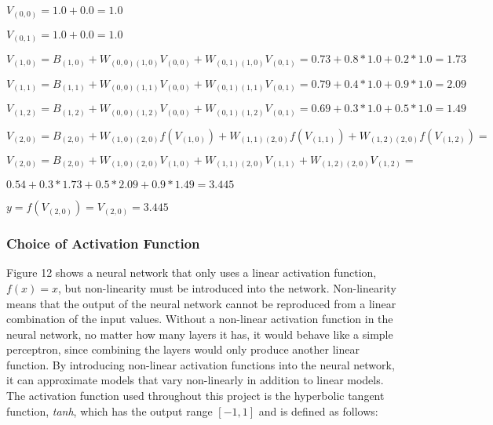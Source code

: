 \documentclass[titlepage]{article}
\begin{document}
\vskip 0.8cm

\centerline{$V_{(0, 0)} = 1.0 + 0.0 = 1.0$}

\vskip 0.2cm

\centerline{$V_{(0, 1)} = 1.0 + 0.0 = 1.0$}

\vskip 0.5cm

\centerline{$V_{(1, 0)} = B_{(1, 0)} + W_{(0, 0) (1, 0)} V_{(0, 0)} + W_{(0, 1) (1, 0)} V_{(0, 1)} = 0.73 + 0.8 * 1.0 + 0.2 * 1.0 = 1.73$}

\vskip 0.2cm

\centerline{$V_{(1, 1)} = B_{(1, 1)} + W_{(0, 0) (1, 1)} V_{(0, 0)} + W_{(0, 1) (1, 1)} V_{(0, 1)} = 0.79 + 0.4 * 1.0 + 0.9 * 1.0 = 2.09$}

\vskip 0.2cm

\centerline{$V_{(1, 2)} = B_{(1, 2)} + W_{(0, 0) (1, 2)} V_{(0, 0)} + W_{(0, 1) (1, 2)} V_{(0, 1)} = 0.69 + 0.3 * 1.0 + 0.5 * 1.0 = 1.49$}

\vskip 0.5cm

\centerline{$V_{(2, 0)} = B_{(2, 0)} + W_{(1, 0) (2, 0)} f(V_{(1, 0)}) + W_{(1, 1) (2, 0)} f(V_{(1, 1)}) + W_{(1, 2) (2, 0)} f(V_{(1, 2)}) =$}

\vskip 0.2cm

\centerline{$V_{(2, 0)} = B_{(2, 0)} + W_{(1, 0) (2, 0)} V_{(1, 0)} + W_{(1, 1) (2, 0)} V_{(1, 1)} + W_{(1, 2) (2, 0)} V_{(1, 2)} =$}

\vskip 0.2cm

\centerline{$0.54 + 0.3 * 1.73 + 0.5 * 2.09 + 0.9 * 1.49 = 3.445$}

\vskip 0.5cm

\centerline{$y = f(V_{(2, 0)}) = V_{(2, 0)} = 3.445$}

\vskip 1cm

\subsubsection{Choice of Activation Function}

\vskip 0.2cm

Figure 12 shows a neural network that only uses a linear activation function, $f(x) = x$, but non-linearity must be introduced into the network. Non-linearity means that the output of the neural network cannot be reproduced from a linear combination of the input values. Without a non-linear activation function in the neural network, no matter how many layers it has, it would behave like a simple perceptron, since combining the layers would only produce another linear function. By introducing non-linear activation functions into the neural network, it can approximate models that vary non-linearly in addition to linear models. The activation function used throughout this project is the hyperbolic tangent function, \emph{tanh}, which has the output range $[-1, 1]$ and is defined as follows:
\end{document}
